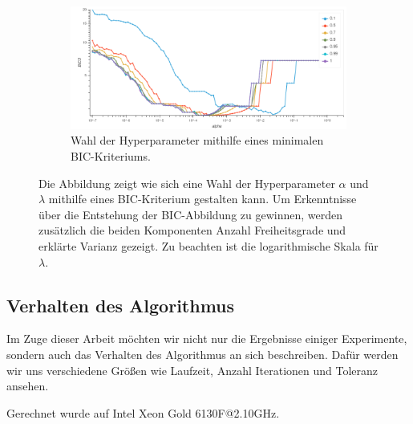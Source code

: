 \begin{figure}
%
\begin{subfigure}{0.9\textwidth}
\includegraphics[width=\textwidth]{figures/Signal_0_bic.png}
\caption{Wahl der Hyperparameter mithilfe eines minimalen BIC-Kriteriums.}
\label{results_parameter_benchmark_bic}
\end{subfigure}
\caption{Die Abbildung zeigt wie sich eine Wahl der Hyperparameter $\alpha$ und $\lambda$ mithilfe eines BIC-Kriterium gestalten kann. Um Erkenntnisse über die Entstehung der BIC-Abbildung zu gewinnen, werden zusätzlich die beiden Komponenten Anzahl Freiheitsgrade und erklärte Varianz gezeigt. Zu beachten ist die logarithmische Skala für $\lambda$.}
\label{results_parameter_benchmark}
\end{figure}




\subsection{Verhalten des Algorithmus}

Im Zuge dieser Arbeit möchten wir nicht nur die Ergebnisse einiger Experimente, sondern auch das Verhalten des Algorithmus an sich beschreiben. Dafür werden wir uns verschiedene Größen wie Laufzeit, Anzahl Iterationen und Toleranz ansehen. 

Gerechnet wurde auf Intel Xeon Gold 6130F@2.10GHz.

